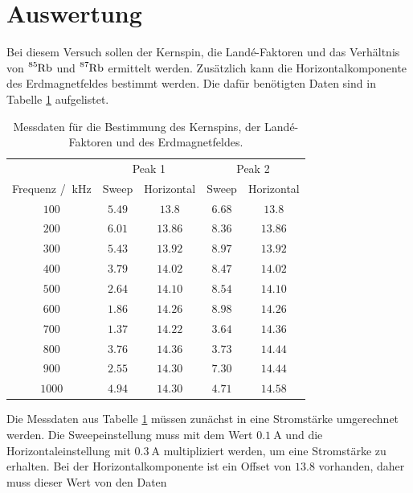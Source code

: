 \section{Auswertung}
\label{sec:Auswertung}
Bei diesem Versuch sollen der Kernspin, die Landé-Faktoren und das Verhältnis von $\ce{^85Rb}$ und $\ce{^87Rb}$ ermittelt 
werden. Zusätzlich kann die Horizontalkomponente des Erdmagnetfeldes bestimmt werden. Die dafür benötigten Daten sind in 
Tabelle \ref{tab:Messdaten_roh} aufgelistet.
\FloatBarrier
\begin{table}
  \centering
  \caption{Messdaten für die Bestimmung des Kernspins, der Landé-Faktoren und des Erdmagnetfeldes.}
  \label{tab:Messdaten_roh}
  \begin{tabular}{c c c c c}
    \toprule
    &\multicolumn{2}{c}{Peak 1}&\multicolumn{2}{c}{Peak 2}\\
    \cmidrule(lr){2-3}\cmidrule(lr){4-5}
    Frequenz / $\SI{}{\kilo\hertz}$&Sweep&Horizontal&Sweep&Horizontal\\
    \midrule
    $\num{100}$&$\num{5.49}$ &$\num{13.8}$ &$\num{6.68}$&$\num{13.8}$\\
    $\num{200}$&$\num{6.01}$ &$\num{13.86}$&$\num{8.36}$&$\num{13.86}$\\
    $\num{300}$&$\num{5.43}$ &$\num{13.92}$&$\num{8.97}$&$\num{13.92}$\\
    $\num{400}$&$\num{3.79}$ &$\num{14.02}$&$\num{8.47}$&$\num{14.02}$\\
    $\num{500}$&$\num{2.64}$ &$\num{14.10}$&$\num{8.54}$&$\num{14.10}$\\
    $\num{600}$&$\num{1.86}$ &$\num{14.26}$&$\num{8.98}$&$\num{14.26}$\\
    $\num{700}$&$\num{1.37}$ &$\num{14.22}$&$\num{3.64}$&$\num{14.36}$\\
    $\num{800}$&$\num{3.76}$ &$\num{14.36}$&$\num{3.73}$&$\num{14.44}$\\
    $\num{900}$&$\num{2.55}$ &$\num{14.30}$&$\num{7.30}$&$\num{14.44}$\\
    $\num{1000}$&$\num{4.94}$&$\num{14.30}$&$\num{4.71}$&$\num{14.58}$\\
    \bottomrule
  \end{tabular}
\end{table} 
\FloatBarrier
Die Messdaten aus Tabelle \ref{tab:Messdaten_roh} müssen zunächst in eine Stromstärke umgerechnet werden. Die Sweepeinstellung 
muss mit dem Wert $\SI{0.1}{\ampere}$ und die Horizontaleinstellung mit $\SI{0.3}{\ampere}$ multipliziert werden, um eine Stromstärke
zu erhalten. Bei der Horizontalkomponente ist ein Offset von $\num{13.8}$ vorhanden, daher muss dieser Wert von den Daten 
